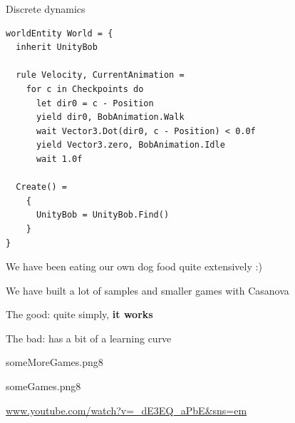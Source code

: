 \documentclass{beamer}
\begin{document}
\begin{frame}[fragile]{Discrete dynamics}
\begin{lstlisting}
worldEntity World = {
  inherit UnityBob

  rule Velocity, CurrentAnimation = 
    for c in Checkpoints do
      let dir0 = c - Position
      yield dir0, BobAnimation.Walk
      wait Vector3.Dot(dir0, c - Position) < 0.0f
      yield Vector3.zero, BobAnimation.Idle
      wait 1.0f

  Create() =
    {
      UnityBob = UnityBob.Find()
    }
}
\end{lstlisting}
\end{frame}

\begin{slide}{
\item We have been eating our own dog food quite extensively :)
\item We have built a lot of samples and smaller games with Casanova
\pause
\item The good: quite simply, \textbf{it works}
\item The bad: has a bit of a learning curve
}\end{slide}

\begin{pictureSlide}
{someMoreGames.png}{8}
\end{pictureSlide}

\begin{picturetextslide}{someGames.png}{8}{
\item \url{www.youtube.com/watch?v=_dE3EQ_aPbE&sns=em}}
\end{picturetextslide}
\end{document}
